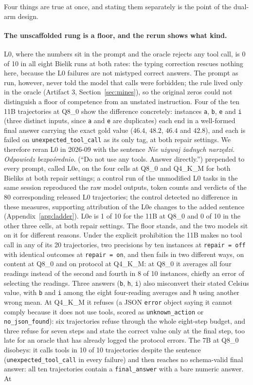 \documentclass[11pt]{article}
\begin{document}
Four things are true at once, and stating them separately is the point of the dual-arm design.

\paragraph{The unscaffolded rung is a floor, and the rerun shows what kind.} L0, where the numbers sit in the prompt and the oracle rejects any tool call, is 0 of 10 in all eight Bielik runs at both rates: the typing correction rescues nothing here, because the L0 failures are not mistyped correct answers. The prompt as run, however, never told the model that calls were forbidden; the rule lived only in the oracle (Artifact 3, Section~\ref{sec:mines}), so the original zeros could not distinguish a floor of competence from an unstated instruction. Four of the ten 11B trajectories at Q8\_0 show the difference concretely: instances \texttt{a}, \texttt{b}, \texttt{e} and \texttt{i} (three distinct inputs, since \texttt{a} and \texttt{e} are duplicates) each end in a well-formed final answer carrying the exact gold value ($46.4$, $48.2$, $46.4$ and $42.8$), and each is failed on \texttt{unexpected\_tool\_call} as its only tag, at both repair settings. We therefore reran L0 in 2026-09 with the sentence \emph{Nie używaj żadnych narzędzi. Odpowiedz bezpośrednio.} (``Do not use any tools. Answer directly.'') prepended to every prompt, called L0e, on the four cells at Q8\_0 and Q4\_K\_M for both Bieliks at both repair settings; a control run of the unmodified L0 tasks in the same session reproduced the raw model outputs, token counts and verdicts of the 80 corresponding released L0 trajectories; the control detected no difference in these measures, supporting attribution of the L0e changes to the added sentence (Appendix~\ref{app:ladder}). L0e is 1 of 10 for the 11B at Q8\_0 and 0 of 10 in the other three cells, at both repair settings. The floor stands, and the two models sit on it for different reasons. Under the explicit prohibition the 11B makes no tool call in any of its 20 trajectories, two precisions by ten instances at \texttt{repair\,=\,off} with identical outcomes at \texttt{repair\,=\,on}, and then fails in two different ways, on content at Q8\_0 and on protocol at Q4\_K\_M: at Q8\_0 it averages all four readings instead of the second and fourth in 8 of 10 instances, chiefly an error of selecting the readings. Three answers (\texttt{b}, \texttt{h}, \texttt{i}) also misconvert their stated Celsius value, with \texttt{b} and \texttt{i} among the eight four-reading averages and \texttt{h} using another wrong mean. At Q4\_K\_M it refuses (a JSON \texttt{error} object saying it cannot comply because it does not use tools, scored as \texttt{unknown\_action} or \texttt{no\_json\_found}): six trajectories refuse through the whole eight-step budget, and three refuse for seven steps and state the correct value only at the final step, too late for an oracle that has already logged the protocol errors. The 7B at Q8\_0 disobeys: it calls tools in 10 of 10 trajectories despite the sentence (\texttt{unexpected\_tool\_call} in every failure) and then reaches no schema-valid final answer: all ten trajectories contain a \texttt{final\_answer} with a bare numeric answer. At 
\end{document}
